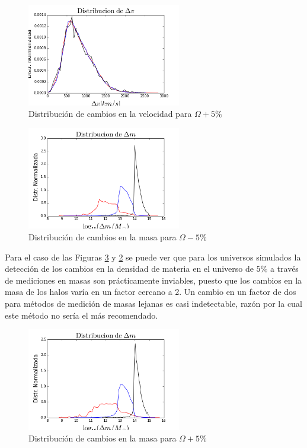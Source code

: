 \begin{figure}[h]
\centering
\includegraphics[width=0.6\textwidth]{Trabajo/deltavmas}
\caption{Distribución de cambios en la velocidad para $\Omega+5\%$}
\label{fig:deltavmas}
\end{figure}

\begin{figure}[h]
\centering
\includegraphics[width=0.6\textwidth]{Trabajo/deltammenos}
\caption{Distribución de cambios en la masa para $\Omega-5\%$}
\label{fig:deltammenos}
\end{figure}

Para el caso de las Figuras \ref{fig:deltammas} y \ref{fig:deltammenos} se puede ver que para los universos simulados la detección de los cambios en la densidad de materia en el universo de $5\%$ a través de mediciones en masas son prácticamente inviables, puesto que los cambios en la masa de los halos varía en un factor cercano a 2. Un cambio en un factor de dos para métodos de medición de masas lejanas es casi indetectable, razón por la cual este método no sería el más recomendado.

\begin{figure}[h]
\centering
\includegraphics[width=0.6\textwidth]{Trabajo/deltammas}
\caption{Distribución de cambios en la masa para $\Omega+5\%$}
\label{fig:deltammas}
\end{figure}

